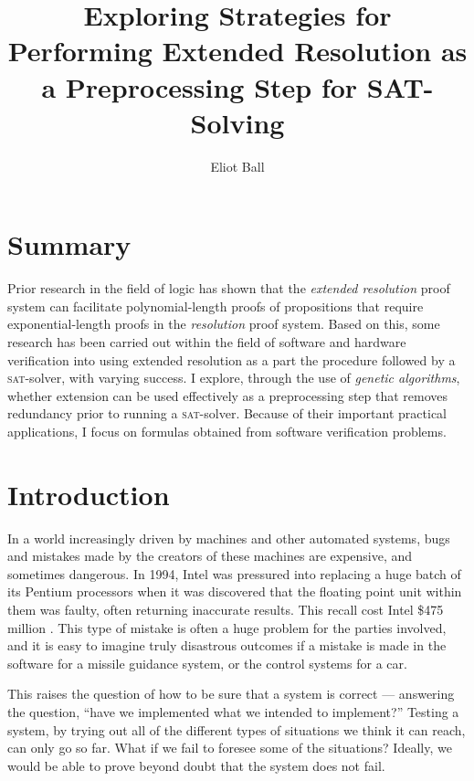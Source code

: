 \documentclass[proof,pdftex,11pt,a4,titlepage]{article}
\newcommand\blankpage{%
    \null
    \thispagestyle{empty}%
    \addtocounter{page}{-1}%
    \newpage}
\newcommand{\sat}{\textsc{sat}}
\begin{document}
\title{\textbf{Exploring Strategies for Performing Extended Resolution as a Preprocessing Step for SAT-Solving}}
\author{Eliot Ball}

\maketitle

\blankpage

\thispagestyle{empty}

\section*{Summary}

Prior research in the field of logic has shown that the \emph{extended resolution} proof system can facilitate polynomial-length proofs of propositions that require exponential-length proofs in the \emph{resolution} proof system. Based on this, some research has been carried out within the field of software and hardware verification into using extended resolution as a part the procedure followed by a \sat{}-solver, with varying success. I explore, through the use of \emph{genetic algorithms}, whether extension can be used effectively as a preprocessing step that removes redundancy prior to running a \sat{}-solver. Because of their important practical applications, I focus on formulas obtained from software verification problems.

\tableofcontents

\newpage
\blankpage

\setcounter{page}{1}
\section{Introduction}

In a world increasingly driven by machines and other automated systems, bugs and mistakes made by the creators of these machines are expensive, and sometimes dangerous. In 1994, Intel was pressured into replacing a huge batch of its Pentium processors when it was discovered that the floating point unit within them was faulty, often returning inaccurate results. This recall cost Intel \$475 million \cite{Nicely:2008}. This type of mistake is often a huge problem for the parties involved, and it is easy to imagine truly disastrous outcomes if a mistake is made in the software for a missile guidance system, or the control systems for a car.

This raises the question of how to be sure that a system is correct --- answering the question, ``have we implemented what we intended to implement?'' Testing a system, by trying out all of the different types of situations we think it can reach, can only go so far. What if we fail to foresee some of the situations? Ideally, we would be able to prove beyond doubt that the system does not fail.
\end{document}
